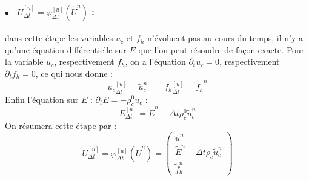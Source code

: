 \paragraph{$\bullet\quad U^{[u]}_{\Delta t} = \varphi^{[u]}_{\Delta t}(\tilde{U}^n)$ :} dans cette étape les variables $u_c$ et $f_h$ n'évoluent pas au cours du temps, il n'y a qu'une équation différentielle sur $E$ que l'on peut résoudre de façon exacte. Pour la variable $u_c$, respectivement $f_h$, on a l'équation $\partial_tu_c = 0$, respectivement $\partial_tf_h = 0$, ce qui nous donne :
$$
  {u_c}^{[u]}_{\Delta t} = \tilde{u}_c^n \qquad {f_h}^{[u]}_{\Delta t} = {\tilde{f}_h}^n
$$
Enfin l'équation sur $E$ : $\partial_t E = -\rho_c^0u_c$ :
$$
  E^{[u]}_{\Delta t} = \tilde{E}^n - \Delta t \rho_c^0 \tilde{u}_c^n
$$
On résumera cette étape par :
$$
  U^{[u]}_{\Delta t} = \varphi^{[u]}_{\Delta t}(\tilde{U}^n)
  = \begin{pmatrix}
    \tilde{u}^n \\
    \tilde{E}^n - \Delta t \rho_c\tilde{u}_c^n \\
    \tilde{f}_h^n
  \end{pmatrix}
$$

